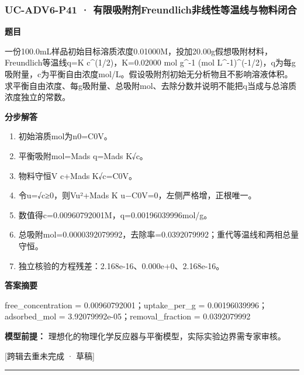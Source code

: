 \documentclass[UTF8,11pt,a4paper]{ctexart}
\begin{document}
\subsubsection*{UC-ADV6-P41 · 有限吸附剂Freundlich非线性等温线与物料闭合}
\noindent\textbf{题目}\par
一份100.0mL样品初始目标溶质浓度0.01000M，投加20.00g假想吸附材料，Freundlich等温线q=K c\textasciicircum{}(1/2)，K=0.02000 mol g\textasciicircum{}-1 (mol L\textasciicircum{}-1)\textasciicircum{}(-1/2)，q为每g吸附量，c为平衡自由浓度mol/L。假设吸附剂初始无分析物且不影响溶液体积。求平衡自由浓度、每g吸附量、总吸附mol、去除分数并说明不能把q当成与总溶质浓度独立的常数。\par
\medskip\noindent\textbf{分步解答}
\begin{enumerate}
\item 初始溶质mol为n0=C0V。
\item 平衡吸附mol=Mads q=Mads K√c。
\item 物料守恒V c+Mads K√c=C0V。
\item 令u=√c≥0，则Vu²+Mads K u−C0V=0，左侧严格增，正根唯一。
\item 数值得c=0.00960792001M，q=0.00196039996mol/g。
\item 总吸附mol=0.0000392079992，去除率=0.0392079992；重代等温线和两相总量守恒。
\item 独立核验的方程残差：2.168e-16、0.000e+0、2.168e-16。
\end{enumerate}
\noindent\textbf{答案摘要}\par
free\_concentration = 0.00960792001；uptake\_per\_g = 0.00196039996；adsorbed\_mol = 3.92079992e-05；removal\_fraction = 0.0392079992\par
\noindent\textbf{模型前提：}
理想化的物理化学反应器与平衡模型，实际实验边界需专家审核。\par
\noindent\textcolor{red!65!black}{[跨辑去重未完成 · 草稿]} \par
\medskip\hrule\medskip
{}
\end{document}
